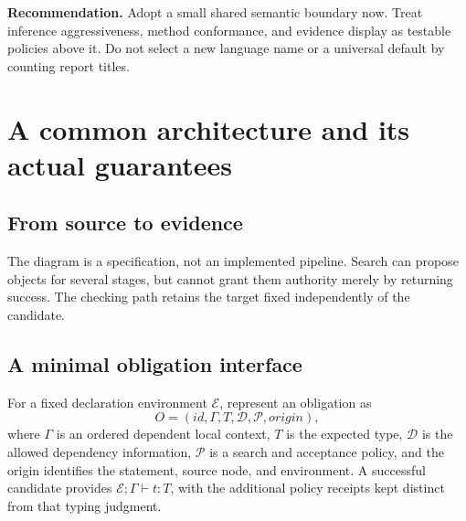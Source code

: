 \documentclass[11pt,letterpaper]{article}
\newcommand{\decision}[1]{\par\smallskip\noindent\textbf{Recommendation.} #1\par\smallskip}
\begin{document}
\decision{Adopt a small shared semantic boundary now. Treat inference aggressiveness,
method conformance, and evidence display as testable policies above it. Do not
select a new language name or a universal default by counting report titles.}

\clearpage
\section{A common architecture and its actual guarantees}\label{sec:architecture}
\subsection{From source to evidence}
\begin{center}
\end{center}
The diagram is a specification, not an implemented pipeline. Search can propose
objects for several stages, but cannot grant them authority merely by returning
success. The checking path retains the target fixed independently of the candidate.

\subsection{A minimal obligation interface}
For a fixed declaration environment \(\mathcal E\), represent an obligation as
\[
 O=(\mathit{id},\Gamma,T,\mathcal D,\mathcal P,\mathit{origin}),
\]
where \(\Gamma\) is an ordered dependent local context, \(T\) is the expected type,
\(\mathcal D\) is the allowed dependency information, \(\mathcal P\) is a search
and acceptance policy, and the origin identifies the statement, source node, and
environment. A successful candidate provides \(\mathcal E;\Gamma\vdash t:T\),
with the additional policy receipts kept distinct from that typing judgment.
\end{document}
